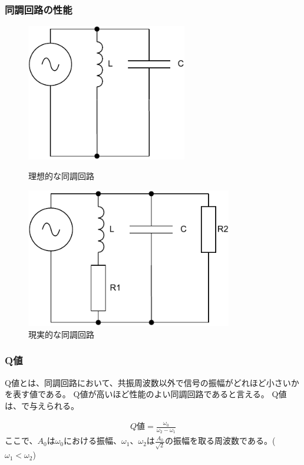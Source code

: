 \documentclass[report.tex]{subfiles}
\begin{document}
\subsubsection{同調回路の性能}

\begin{figure}[H]
	\begin{minipage}[b]{0.4\linewidth}
		\centering
		\includegraphics[width=7cm]{fig/kyo.pdf}
		\caption{理想的な同調回路}
		\label{fig:kyo}
	\end{minipage}
	\begin{minipage}[b]{0.6\linewidth}
		\centering
		\includegraphics[width=9cm]{fig/kyo2.pdf}
		\caption{現実的な同調回路}
		\label{fig:kyo2}
	\end{minipage}
\end{figure}

\subsubsection{Q値}

Q値とは、同調回路において、共振周波数以外で信号の振幅がどれほど小さいかを表す値である。
Q値が高いほど性能のよい同調回路であると言える。
Q値は、で与えられる\cite{ノート}。

\begin{align}
	Q値 =\frac{\omega_0}{\omega_2 - \omega_1}
\end{align}
ここで、$A_0$は$\omega_0$における振幅、$\omega_1、\omega_2$は$\frac{A_0}{\sqrt{2}}$の振幅を取る周波数である。($\omega_1<\omega_2$) \label{eq:Q}
\end{document}

